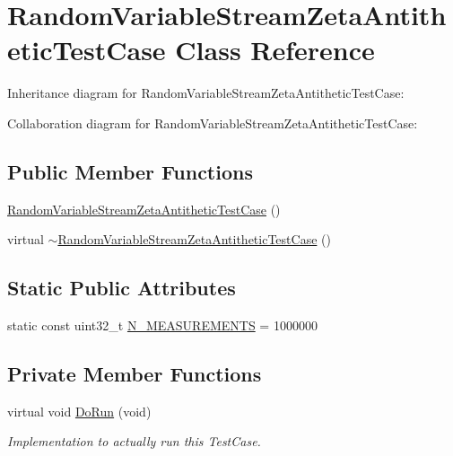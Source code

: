 \hypertarget{classRandomVariableStreamZetaAntitheticTestCase}{}\section{Random\+Variable\+Stream\+Zeta\+Antithetic\+Test\+Case Class Reference}
\label{classRandomVariableStreamZetaAntitheticTestCase}


Inheritance diagram for Random\+Variable\+Stream\+Zeta\+Antithetic\+Test\+Case\+:


Collaboration diagram for Random\+Variable\+Stream\+Zeta\+Antithetic\+Test\+Case\+:
\subsection*{Public Member Functions}
\begin{DoxyCompactItemize}
\item 
\hyperlink{classRandomVariableStreamZetaAntitheticTestCase_af3556904e443ba197b5b5ed343bdf358}{Random\+Variable\+Stream\+Zeta\+Antithetic\+Test\+Case} ()
\item 
virtual \hyperlink{classRandomVariableStreamZetaAntitheticTestCase_aa4d8fa6b8f58b9a193fcb79389f91050}{$\sim$\+Random\+Variable\+Stream\+Zeta\+Antithetic\+Test\+Case} ()
\end{DoxyCompactItemize}
\subsection*{Static Public Attributes}
\begin{DoxyCompactItemize}
\item 
static const uint32\+\_\+t \hyperlink{classRandomVariableStreamZetaAntitheticTestCase_a0a981bdb2baa96c4abbf5dfb6b1533b9}{N\+\_\+\+M\+E\+A\+S\+U\+R\+E\+M\+E\+N\+TS} = 1000000
\end{DoxyCompactItemize}
\subsection*{Private Member Functions}
\begin{DoxyCompactItemize}
\item 
virtual void \hyperlink{classRandomVariableStreamZetaAntitheticTestCase_ac97c0559c3511e171350fabb6a5e8c74}{Do\+Run} (void)
\begin{DoxyCompactList}\small\item\em Implementation to actually run this Test\+Case. \end{DoxyCompactList}\end{DoxyCompactItemize}
